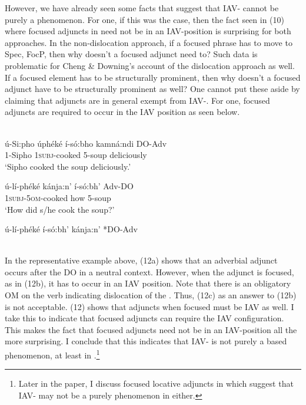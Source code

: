 \documentclass[output=paper,newtxmath,modfonts,nonflat,draft]{langsci/langscibook}
\begin{document}
However, we have already seen some  facts that suggest that IAV- cannot be purely a  phenomenon. For one, if this was the case, then the fact seen in (10) where focused adjuncts in  need not be in an IAV-position is surprising for both approaches. In the non-dislocation approach, if a focused phrase has to move to Spec, FocP, then why doesn't a focused adjunct need to? Such data is problematic for Cheng \& Downing's account of the dislocation approach as well. If a focused element has to be structurally prominent, then why doesn’t a focused adjunct have to be structurally prominent as well? One cannot put these aside by claiming that adjuncts are in general exempt from IAV-. For one,  focused adjuncts are required to occur in the IAV position as seen below.

\ea\label{ex:selvanathan:12}
 \citep[8]{chengdowning2014}\\
\ea\label{ex:selvanathan:12a}
	\gll ú-Si:pho  úphéké          í-só:bho   kamná:ndi  DO-Adv\\
	1-Sipho   \textsc{1subj}{}-cooked    5-soup    deliciously\\
\glt `Sipho cooked the soup deliciously.'

\ex\label{ex:selvanathan:12b}
	\gll ú-lí-phéké          kánja:n’    í-só:bh’     Adv-DO\\
\textsc{1subj}{}-\textsc{5om}{}-cooked   how     5-soup\\
\glt `How did s/he cook the soup?'

\ex\label{ex:selvanathan:12c}
	\gll *ú-lí-phéké     í-só:bh’  kánja:n’     *DO-Adv\\
	\\	
\z
\z

In the representative example above, (12a) shows that an adverbial adjunct occurs after the DO in a neutral context. However, when the adjunct is focused, as in (12b), it has to occur in an IAV position. Note that there is an obligatory OM on the verb indicating dislocation of the . Thus, (12c) as an answer to (12b) is not acceptable. (12) shows that  adjuncts when focused must be IAV as well. I take this to indicate that focused adjuncts can require the IAV configuration. This makes the fact that  focused adjuncts need not be in an IAV-position all the more surprising. I conclude that this indicates that IAV- is not purely a  based phenomenon, at least in .\footnote{Later in the paper, I discuss focused locative adjuncts in  which suggest that IAV- may not be a purely  phenomenon in  either.}  
\end{document}
